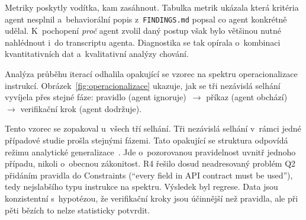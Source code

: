 Metriky poskytly vodítka, kam zasáhnout. Tabulka metrik ukázala
která kritéria agent nesplnil a~behaviorální popis
z~\texttt{FINDINGS.md} popsal co agent konkrétně udělal. K~pochopení
\textit{proč} agent zvolil daný postup však bylo většinou nutné
nahlédnout i~do transcriptu agenta. Diagnostika se tak opírala
o~kombinaci kvantitativních dat a~kvalitativní analýzy chování.

Analýza průběhu iterací odhalila opakující se vzorec na spektru
operacionalizace instrukcí. Obrázek~\ref{fig:operacionalizace}
ukazuje, jak se tři nezávislá selhání vyvíjela přes stejné fáze:
pravidlo (agent ignoruje)~$\to$ příkaz (agent obchází)~$\to$
verifikační krok (agent dodržuje).

Tento vzorec se zopakoval u~všech tří selhání. Tři nezávislá selhání
v~rámci jedné případové studie prošla stejnými fázemi. Tato opakující
se struktura odpovídá režimu analytické
generalizace~\cite{yin2018}. Jde o~pozorovanou pravidelnost uvnitř
jednoho případu, nikoli o~obecnou zákonitost. R4 řešilo dosud neadresovaný
problém \acs{Q2} přidáním pravidla do Constraints (``every field in API
contract must be used''), tedy nejslabšího typu instrukce na spektru.
Výsledek byl regrese. Data jsou konzistentní s~hypotézou, že
verifikační kroky jsou účinnější než pravidla, ale při pěti bězích
to nelze statisticky potvrdit.

